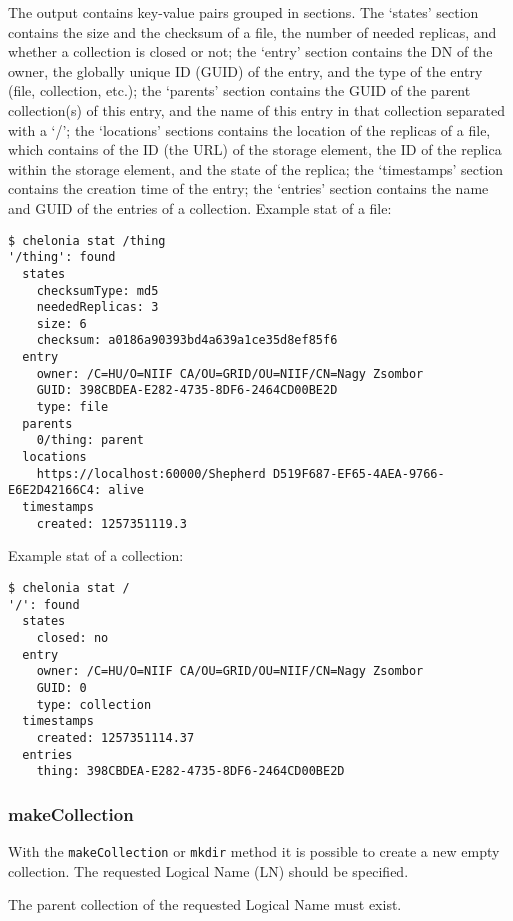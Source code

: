 The output contains key-value pairs grouped in sections. The `states' section contains the size and the checksum of a file, the number of needed replicas, and whether a collection is closed or not; the `entry' section contains the DN of the owner, the globally unique ID (GUID) of the entry, and the type of the entry (file, collection, etc.); the `parents' section contains the GUID of the parent collection(s) of this entry, and the name of this entry in that collection separated with a `/'; the `locations' sections contains the location of the replicas of a file, which contains of the ID (the URL) of the storage element, the ID of the replica within the storage element, and the state of the replica; the `timestamps' section contains the creation time of the entry; the `entries' section contains the name and GUID of the entries of a collection.
Example stat of a file:
\begin{verbatim}
$ chelonia stat /thing
'/thing': found
  states
    checksumType: md5
    neededReplicas: 3
    size: 6
    checksum: a0186a90393bd4a639a1ce35d8ef85f6
  entry
    owner: /C=HU/O=NIIF CA/OU=GRID/OU=NIIF/CN=Nagy Zsombor
    GUID: 398CBDEA-E282-4735-8DF6-2464CD00BE2D
    type: file
  parents
    0/thing: parent
  locations
    https://localhost:60000/Shepherd D519F687-EF65-4AEA-9766-E6E2D42166C4: alive
  timestamps
    created: 1257351119.3
\end{verbatim}
Example stat of a collection:
\begin{verbatim}
$ chelonia stat /
'/': found
  states
    closed: no
  entry
    owner: /C=HU/O=NIIF CA/OU=GRID/OU=NIIF/CN=Nagy Zsombor
    GUID: 0
    type: collection
  timestamps
    created: 1257351114.37
  entries
    thing: 398CBDEA-E282-4735-8DF6-2464CD00BE2D    
\end{verbatim}

\subsubsection{makeCollection} %
\label{ssub:makecollection}
With the \texttt{makeCollection} or \texttt{mkdir} method it is possible to create a new empty collection. The requested Logical Name (LN) should be specified.
\hspace*{0.5cm}
\begin{shaded}
\end{shaded}

The parent collection of the requested Logical Name must exist.

